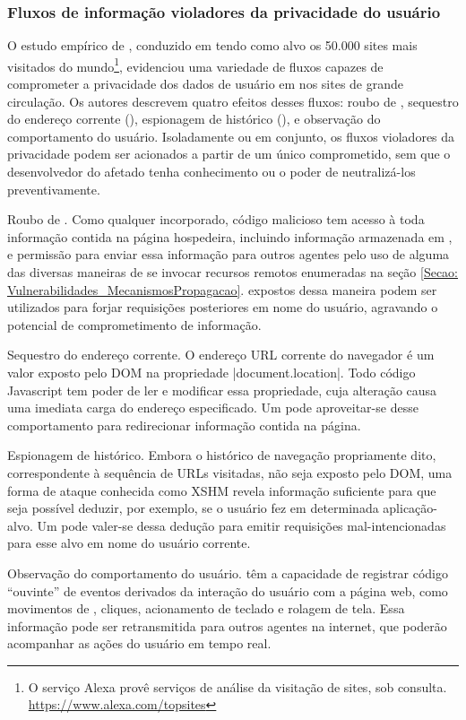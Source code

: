 \subsubsection{Fluxos de informação violadores da privacidade do usuário}

O estudo empírico de \citeauthor{Jang2010}, conduzido em \citeyear{Jang2010} tendo como alvo os 50.000 sites mais visitados do mundo\footnote{O serviço Alexa provê serviços de análise da visitação de sites, sob consulta. \url{https://www.alexa.com/topsites}}, evidenciou uma variedade de fluxos capazes de comprometer a privacidade dos dados de usuário em nos sites  de grande circulação. Os autores descrevem quatro efeitos desses fluxos: roubo de , sequestro do endereço corrente (), espionagem de histórico (), e observação do comportamento do usuário. Isoladamente ou em conjunto, os fluxos violadores da privacidade podem ser acionados a partir de um único \script{} comprometido, sem que o desenvolvedor do  afetado tenha conhecimento ou o poder de neutralizá-los preventivamente.

\begin{alineas}
	\item Roubo de . Como qualquer \script{} incorporado, código malicioso tem acesso à toda informação contida na página hospedeira, incluindo informação armazenada em , e permissão para enviar essa informação para outros agentes pelo uso de alguma das diversas maneiras de se invocar recursos remotos enumeradas na seção \ref{Secao: Vulnerabilidades_MecanismosPropagacao}.  expostos dessa maneira podem ser utilizados para forjar requisições posteriores em nome do usuário, agravando o potencial de comprometimento de informação.
	\item Sequestro do endereço corrente. O endereço URL corrente do navegador é um valor exposto pelo DOM na propriedade |document.location|. Todo código Javascript tem poder de ler e modificar essa propriedade, cuja alteração causa uma imediata carga do endereço especificado. Um \script{} pode aproveitar-se desse comportamento para redirecionar informação contida na página.
	\item Espionagem de histórico. Embora o histórico de navegação propriamente dito, correspondente à sequência de URLs visitadas, não seja exposto pelo DOM, uma forma de ataque conhecida como XSHM  \cite{OWASP:XSHM} revela informação suficiente para que seja possível deduzir, por exemplo, se o usuário fez  em determinada aplicação-alvo. Um \script{} pode valer-se dessa dedução para emitir requisições mal-intencionadas para esse alvo em nome do usuário corrente.
	\item Observação do comportamento do usuário. \Scripts{} têm a capacidade de registrar código ``ouvinte'' de eventos derivados da interação do usuário com a página web, como movimentos de , cliques, acionamento de teclado e rolagem de tela. Essa informação pode ser retransmitida para outros agentes na internet, que poderão acompanhar as ações do usuário em tempo real.
\end{alineas}

